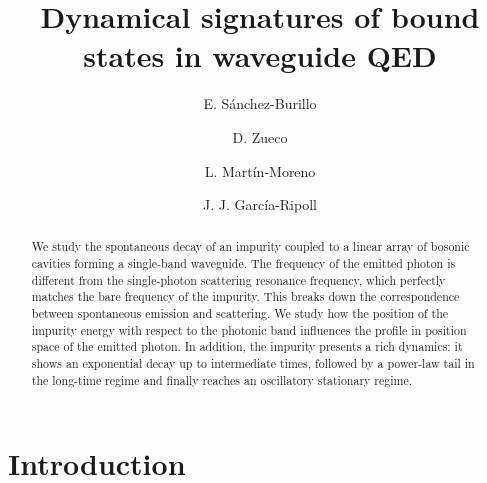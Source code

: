 \documentclass[aps,pra,twocolumn,floatfix,superscriptaddress]{revtex4-1}%
\begin{document}
\title{Dynamical signatures of bound states in waveguide QED}

\author{E. S\'anchez-Burillo}
\author{D. Zueco}
\author{L. Mart\'in-Moreno}
\author{J. J. Garc\'ia-Ripoll}
\begin{abstract}
We study the spontaneous decay of an impurity coupled to a linear array of bosonic cavities forming a single-band waveguide. The frequency of the emitted photon is different from the single-photon scattering resonance frequency, which perfectly matches the bare frequency of the impurity. This breaks down the correspondence between spontaneous emission and scattering. We study how the position of the impurity energy with respect to the photonic band influences the profile in position space of the emitted photon. In addition, the impurity presents a rich dynamics: it shows an exponential decay up to intermediate times, followed by a power-law tail in the long-time regime and finally reaches an oscillatory stationary regime.
\end{abstract}

\maketitle

\section{Introduction}
\end{document}
